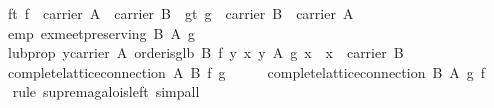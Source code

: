 \begin{isabellebody}
\ \ \ ft{}\ {}f\ {}\ carrier\ A\ {}\ carrier\ B{}\ \ gt{}\ {}g\ {}\ carrier\ B\ {}\ carrier\ A{}\isanewline
\ \ \ emp{}\ {}ex{}meet{}preserving\ B\ A\ g{}\isanewline
\ \ \ lub{}prop{}\ {}{}y{}carrier\ A{}\ order{}is{}glb\ B\ {}f\ y{}\ {}x{}\ y\ {}\isactrlbsub A\ \isactrlesub g\ x\ {}\ x\ {}\ carrier\ B{}{}\isanewline
\ \ \ {}complete{}lattice{}connection\ A\ B\ f\ g{}\isanewline
%
\isadelimproof
%
\endisadelimproof
%
\isatagproof
{}\isamarkupfalse%
\ {}\isanewline
\ \ \isamarkupfalse%
\ {}complete{}lattice{}connection\ {}B{}{}\ {}A{}{}\ g\ f{}\isanewline
\ \ \isamarkupfalse%
\ {}rule\ suprema{}galois{}left{}\ simp{}all{}\isanewline

\end{isabellebody}
